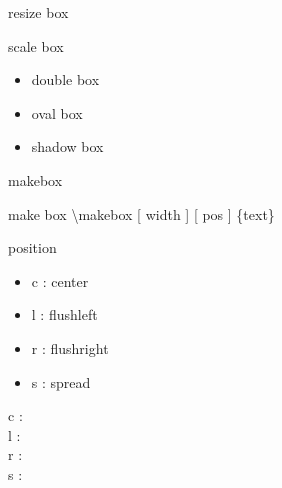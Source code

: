 \documentclass[ aspectratio=149,  14pt,blue,xcolor=pdftex,dvipsnames,table,handout,notes]{beamer}
\begin{document}
\begin{frame}[t]{resize box}
	


			\begin{block} {scale box}
				\begin{itemize}
				\item double box
				\item oval box
				\item shadow box
				\end{itemize}
			\end{block}

	
		\end{frame}



		\begin{frame}[t]{makebox}


			\begin{block} {make box}
			\textbackslash makebox [ width ] [ pos ] \{text\}
			\end{block}


			\begin{block} {position}
				\begin{itemize}
				\item	c : center
				\item	l : flushleft
				\item	r : flushright
				\item	s : spread
				\end{itemize}
			\end{block}

			\begin{example}
			c : \\
			l : \\
			r : \\
			s : \\
			\end{example}


		
		\end{frame}
\end{document}
